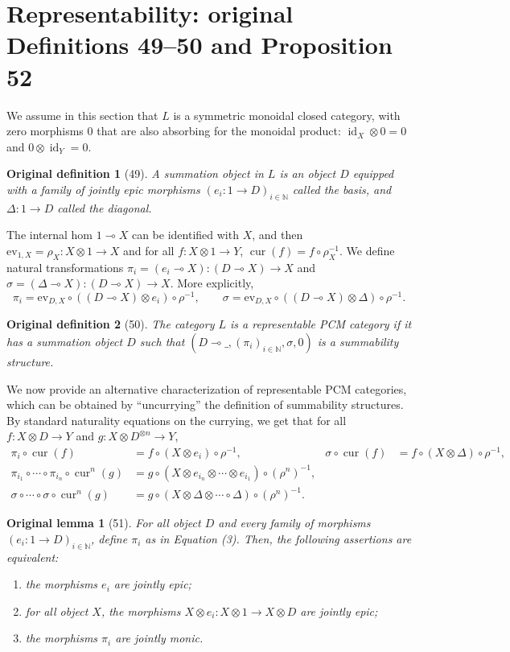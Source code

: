 \documentclass[10pt,a4paper]{article}
\newcommand{\lolli}{\multimap}
\newcommand{\cur}{\operatorname{cur}}
\newcommand{\id}{\operatorname{id}}
\newtheorem*{originaldef}{Original definition}
\newtheorem*{originallemma}{Original lemma}
\begin{document}
\section*{Representability: original Definitions 49--50 and Proposition 52}
We assume in this section that $L$ is a symmetric monoidal closed category, with zero morphisms $0$ that are also absorbing for the monoidal product: $\id_X\otimes0=0$ and $0\otimes\id_Y=0$.
\begin{originaldef}[49] A summation object in $L$ is an object $D$ equipped with a family of jointly epic morphisms $(e_i:1\to D)_{i\in\mathbb N}$ called the basis, and $\Delta:1\to D$ called the diagonal.\end{originaldef}
The internal hom $1\lolli X$ can be identified with $X$, and then $\mathrm{ev}_{1,X}=\rho_X:X\otimes1\to X$ and for all $f:X\otimes1\to Y$, $\cur(f)=f\circ\rho_X^{-1}$. We define natural transformations $\pi_i=(e_i\lolli X):(D\lolli X)\to X$ and $\sigma=(\Delta\lolli X):(D\lolli X)\to X$. More explicitly,
\[\pi_i=\mathrm{ev}_{D,X}\circ((D\lolli X)\otimes e_i)\circ\rho^{-1},\qquad\sigma=\mathrm{ev}_{D,X}\circ((D\lolli X)\otimes\Delta)\circ\rho^{-1}.\tag{3}\]
\begin{originaldef}[50] The category $L$ is a representable PCM category if it has a summation object $D$ such that $(D\lolli\_,(\pi_i)_{i\in\mathbb N},\sigma,0)$ is a summability structure.\end{originaldef}
We now provide an alternative characterization of representable PCM categories, which can be obtained by ``uncurrying'' the definition of summability structures. By standard naturality equations on the currying, we get that for all $f:X\otimes D\to Y$ and $g:X\otimes D^{\otimes n}\to Y$,
\begin{align*}\pi_i\circ\cur(f)&=f\circ(X\otimes e_i)\circ\rho^{-1},&\sigma\circ\cur(f)&=f\circ(X\otimes\Delta)\circ\rho^{-1},\\\pi_{i_1}\circ\cdots\circ\pi_{i_n}\circ\cur^n(g)&=g\circ(X\otimes e_{i_n}\otimes\cdots\otimes e_{i_1})\circ(\rho^n)^{-1},\\\sigma\circ\cdots\circ\sigma\circ\cur^n(g)&=g\circ(X\otimes\Delta\otimes\cdots\circ\Delta)\circ(\rho^n)^{-1}.\tag{4}\end{align*}
\begin{originallemma}[51] For all object $D$ and every family of morphisms $(e_i:1\to D)_{i\in\mathbb N}$, define $\pi_i$ as in Equation (3). Then, the following assertions are equivalent:
\begin{enumerate}\item the morphisms $e_i$ are jointly epic;\item for all object $X$, the morphisms $X\otimes e_i:X\otimes1\to X\otimes D$ are jointly epic;\item the morphisms $\pi_i$ are jointly monic.\end{enumerate}\end{originallemma}
\end{document}
